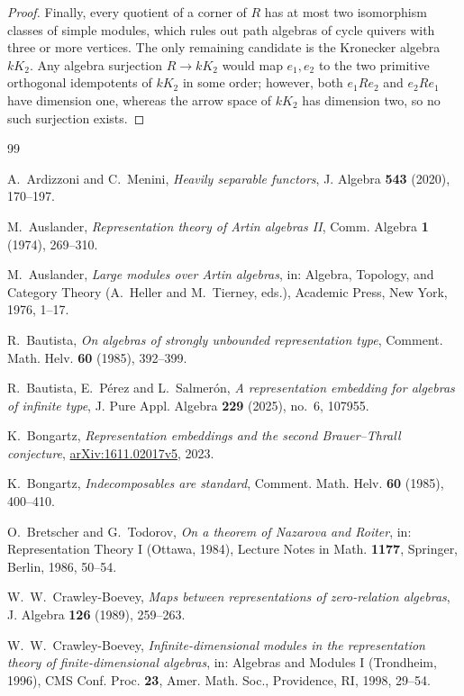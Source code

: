 \documentclass[a4paper,reqno,10pt]{amsart}
\theoremstyle{definition}
\numberwithin{equation}{section}
\begin{document}
\begin{proof}
Finally, every quotient of a corner of $R$ has at most two isomorphism classes of simple
modules, which rules out path algebras of cycle quivers with three or more
vertices. The only remaining candidate is the
Kronecker algebra $kK_2$. Any algebra surjection $R\to kK_2$ would map
$e_1,e_2$ to the two primitive orthogonal idempotents of $kK_2$ in some order;
however, both $e_1Re_2$ and $e_2Re_1$ have dimension one, whereas the arrow space of $kK_2$ has dimension two, so no such surjection exists.
\end{proof}

\begin{thebibliography}{99}

A.~Ardizzoni and C.~Menini,
\emph{Heavily separable functors},
J. Algebra \textbf{543} (2020), 170--197.

M.~Auslander,
\emph{Representation theory of Artin algebras II},
Comm. Algebra \textbf{1} (1974), 269--310.

M.~Auslander,
\emph{Large modules over Artin algebras},
in: Algebra, Topology, and Category Theory (A.~Heller and M.~Tierney,
eds.), Academic Press, New York, 1976, 1--17.

R.~Bautista,
\emph{On algebras of strongly unbounded representation type},
Comment. Math. Helv. \textbf{60} (1985), 392--399.

R.~Bautista, E.~P\'erez and L.~Salmer\'on,
\emph{A representation embedding for algebras of infinite type},
J. Pure Appl. Algebra \textbf{229} (2025), no.~6, 107955.

K.~Bongartz,
\emph{Representation embeddings and the second Brauer--Thrall conjecture},
\href{https://arxiv.org/abs/1611.02017v5}{arXiv:1611.02017v5}, 2023.

K.~Bongartz,
\emph{Indecomposables are standard},
Comment. Math. Helv. \textbf{60} (1985), 400--410.

O.~Bretscher and G.~Todorov,
\emph{On a theorem of Nazarova and Roiter},
in: Representation Theory I (Ottawa, 1984), Lecture Notes in Math.
\textbf{1177}, Springer, Berlin, 1986, 50--54.

W.~W.~Crawley-Boevey,
\emph{Maps between representations of zero-relation algebras},
J. Algebra \textbf{126} (1989), 259--263.

W.~W.~Crawley-Boevey,
\emph{Infinite-dimensional modules in the representation theory of
finite-dimensional algebras},
in: Algebras and Modules I (Trondheim, 1996), CMS Conf. Proc.
\textbf{23}, Amer. Math. Soc., Providence, RI, 1998, 29--54.


\end{thebibliography}
\end{document}
